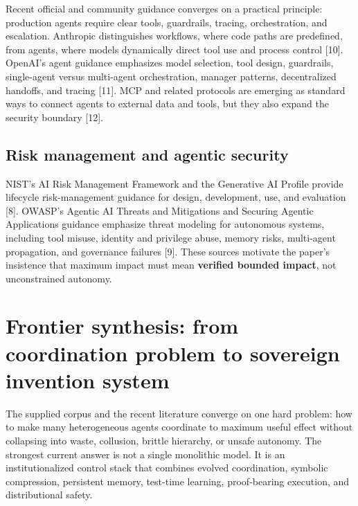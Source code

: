 \documentclass[
  11pt,
]{article}
\begin{document}
Recent official and community guidance converges on a practical
principle: production agents require clear tools, guardrails, tracing,
orchestration, and escalation. Anthropic distinguishes workflows, where
code paths are predefined, from agents, where models dynamically direct
tool use and process control {[}10{]}. OpenAI's agent guidance
emphasizes model selection, tool design, guardrails, single-agent versus
multi-agent orchestration, manager patterns, decentralized handoffs, and
tracing {[}11{]}. MCP and related protocols are emerging as standard
ways to connect agents to external data and tools, but they also expand
the security boundary {[}12{]}.

\subsection{Risk management and agentic
security}\label{risk-management-and-agentic-security}

NIST's AI Risk Management Framework and the Generative AI Profile
provide lifecycle risk-management guidance for design, development, use,
and evaluation {[}8{]}. OWASP's Agentic AI Threats and Mitigations and
Securing Agentic Applications guidance emphasize threat modeling for
autonomous systems, including tool misuse, identity and privilege abuse,
memory risks, multi-agent propagation, and governance failures {[}9{]}.
These sources motivate the paper's insistence that maximum impact must
mean \textbf{verified bounded impact}, not unconstrained autonomy.

\section{Frontier synthesis: from coordination problem to sovereign
invention
system}\label{frontier-synthesis-from-coordination-problem-to-sovereign-invention-system}

The supplied corpus and the recent literature converge on one hard
problem: how to make many heterogeneous agents coordinate to maximum
useful effect without collapsing into waste, collusion, brittle
hierarchy, or unsafe autonomy. The strongest current answer is not a
single monolithic model. It is an institutionalized control stack that
combines evolved coordination, symbolic compression, persistent memory,
test-time learning, proof-bearing execution, and distributional safety.
\end{document}
